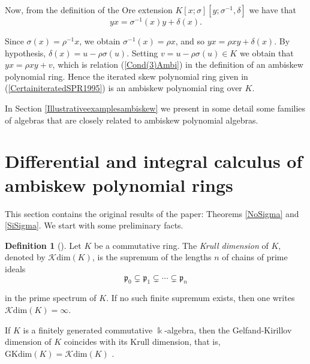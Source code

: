 \documentclass{amsart}
\theoremstyle{definition}
\newtheorem{definition}[theorem]{Definition}
\theoremstyle{remark}
\numberwithin{equation}{section}
\begin{document}
Now, from the definition of the Ore extension $K[x;\sigma][y;\sigma^{-1},\delta]$ we have that 
\[
yx=\sigma^{-1}(x)y+\delta(x).
\]

Since $\sigma(x)=\rho^{-1}x$, we obtain $\sigma^{-1}(x)=\rho x$, and so $yx = \rho xy+\delta(x)$. By hypothesis, $\delta(x) = u-\rho\sigma(u)$. Setting $v=u-\rho\sigma(u)\in K$ we obtain that $yx=\rho xy+v$, which is relation (\ref{Cond(3)Ambi}) in the definition of an ambiskew polynomial ring. Hence the iterated skew polynomial ring given in (\ref{CertainiteratedSPR1995}) is an ambiskew polynomial ring over $K$.

In Section \ref{Illustrativeexamplesambiskew} we present in some detail some families of algebras that are closely related to ambiskew polynomial algebras.


\section{Differential and integral calculus of ambiskew polynomial rings}\label{Differentialandintegralcalculusbi-quadraticalgebras}

This section contains the original results of the paper: Theorems \ref{NoSigma} and \ref{SiSigma}. We start with some preliminary facts.

\begin{definition}[{\cite[Chapter 11]{AtiyahMacdonald1969}}]\label{Krulldimdef}
Let $K$ be a commutative ring. The \emph{Krull dimension} of $K$, denoted by $\mathcal{K}\mathrm{dim}(K)$, is the supremum of the lengths $n$ of chains of prime ideals
\[
\mathfrak p_0 \subsetneq \mathfrak p_1 \subsetneq \cdots \subsetneq \mathfrak p_n
\]

in the prime spectrum of $K$. If no such finite supremum exists, then one writes $\mathcal{K}\mathrm{dim}(K)=\infty$.
\end{definition}

If $K$ is a finitely generated commutative $\Bbbk$-algebra, then the Gelfand-Kirillov dimension of $K$ coincides with its Krull dimension, that is, $\mathrm{GKdim}(K)=\mathcal{K}\mathrm{dim}(K)$ \cite[Theorem 4.5]{KrauseLenagan2000}.
\end{document}
